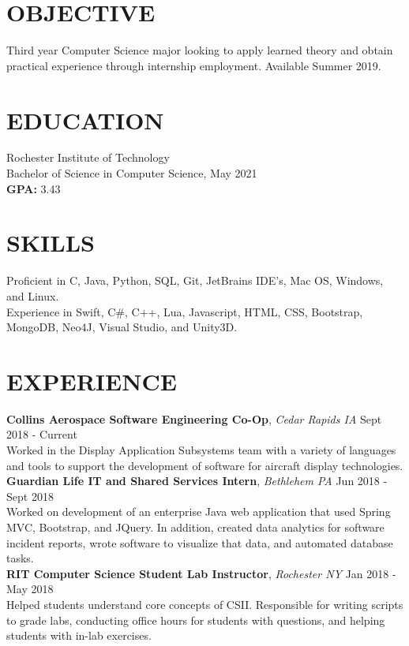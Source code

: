 \documentclass[line, margin]{res}
\begin{document}
\address{(484) 554-8487\\ emp9173@rit.edu}

\begin{resume}




\section{OBJECTIVE}
Third year Computer Science major looking to apply learned theory and obtain practical experience through internship employment. Available Summer 2019.

\section{EDUCATION} 
 Rochester Institute of Technology \\
 Bachelor of Science in Computer Science, May 2021\\
 \textbf{GPA:} 3.43
 
\section{SKILLS}
Proficient in C, Java, Python, SQL, Git, JetBrains IDE’s, Mac OS, Windows, and Linux. \\
Experience in Swift, C\#, C++, Lua, Javascript, HTML, CSS, Bootstrap, MongoDB, Neo4J, Visual Studio, and Unity3D.
 
\section{EXPERIENCE} 
\textbf{Collins Aerospace Software Engineering Co-Op}, \textit{Cedar Rapids IA} \hfill Sept 2018 - Current \\
Worked in the Display Application Subsystems team with a variety of languages and tools to support the development of software for aircraft display technologies.\\ [10pt]
\textbf{Guardian Life IT and Shared Services Intern}, \textit{Bethlehem PA} \hfill Jun 2018 - Sept 2018 \\
Worked on development of an enterprise Java web application that used Spring MVC, Bootstrap, and JQuery.  In addition, created
data analytics for software incident reports, wrote software to visualize that data, and automated database tasks.\\ [10pt]
\textbf{RIT Computer Science Student Lab Instructor}, \textit{Rochester NY} \hfill Jan 2018 - May 2018 \\
Helped students understand core concepts of CSII. Responsible for writing scripts
to grade labs, conducting office hours for students with questions, and helping students
with in-lab exercises.


\end{resume}
\end{document}

